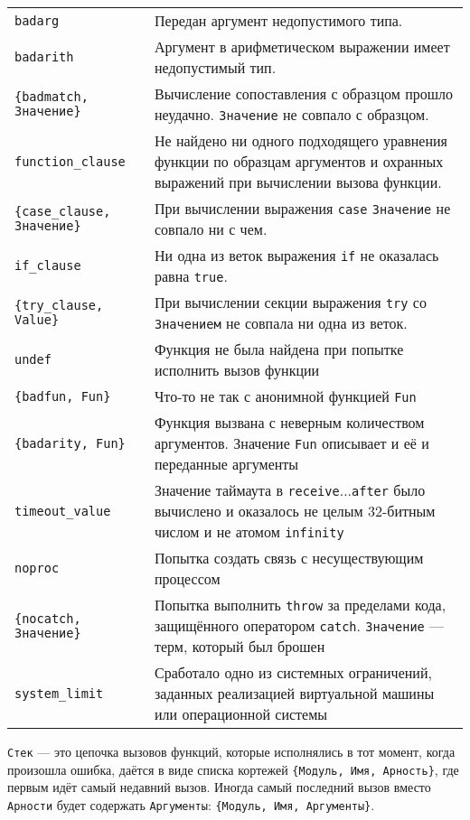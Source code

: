 \begin{center}
\begin{tabular}{|>{\raggedright}p{110pt}|>{\raggedright}p{320pt}|}
\hline
\multicolumn{2}{|p{326pt}|}{Причины выхода}\tabularnewline
\hline
\texttt{badarg}  & 
Передан аргумент недопустимого типа. \tabularnewline
\hline
\texttt{badarith}  &
Аргумент в арифметическом выражении имеет недопустимый тип. \tabularnewline
\hline
\texttt{\{badmatch, Значение\}}  & 
Вычисление сопоставления с образцом прошло неудачно. \texttt{Значение} не совпало
с образцом.
\tabularnewline
\hline
\texttt{function\_clause}  & 
Не найдено ни одного подходящего уравнения функции по образцам аргументов и
охранных выражений при вычислении вызова функции. \tabularnewline
\hline
\texttt{\{case\_clause, Значение\}}  & 
При вычислении выражения \texttt{case} \texttt{Значение} не совпало ни с чем. \tabularnewline
\hline
\texttt{if\_clause}  & 
Ни одна из веток выражения \texttt{if} не оказалась равна \texttt{true}.
\tabularnewline
\hline
\texttt{\{try\_clause, Value\}}  &
При вычислении секции выражения \texttt{try} со \texttt{Значением} не совпала ни
одна из веток. \tabularnewline
\hline
\texttt{undef}  & 
Функция не была найдена при попытке исполнить вызов функции \tabularnewline
\hline
\texttt{\{badfun, Fun\}}  & 
Что-то не так с анонимной функцией \texttt{Fun} \tabularnewline
\hline
\texttt{\{badarity, Fun\}}  & 
Функция вызвана с неверным количеством аргументов. Значение \texttt{Fun} описывает
и её и переданные аргументы \tabularnewline
\hline
\texttt{timeout\_value}  & 
Значение таймаута в \texttt{receive}$...$\texttt{after} было вычислено и оказалось
не целым 32-битным числом и не атомом \texttt{infinity} \tabularnewline
\hline
\texttt{noproc}  & 
Попытка создать связь с несуществующим процессом \tabularnewline
\hline
\texttt{\{nocatch, Значение\}}  & 
Попытка выполнить \texttt{throw} за пределами кода, защищённого оператором
\texttt{catch}. \texttt{Значение} --- терм, который был брошен \tabularnewline
\hline
\texttt{system\_limit}  & Сработало одно из системных ограничений, заданных 
реализацией виртуальной машины или операционной системы \tabularnewline
\hline
\end{tabular}
\end{center}

\texttt{Стек} --- это цепочка вызовов функций, которые исполнялись в тот момент,
когда произошла ошибка, даётся в виде списка кортежей \texttt{\{Модуль, Имя, 
Арность\}}, где первым идёт самый недавний вызов. Иногда самый последний вызов 
вместо \texttt{Арности} будет содержать \texttt{Аргументы}: \texttt{\{Модуль, 
Имя, Аргументы\}}.


